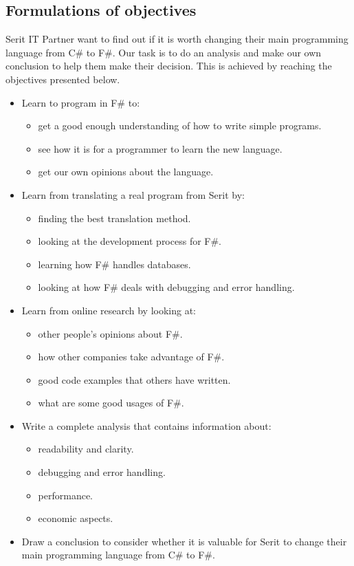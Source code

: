 \documentclass[12pt, a4paper]{article}
\begin{document}
\newpage

\subsection{Formulations of objectives}

Serit IT Partner want to find out if it is worth changing their main programming language from C\# to F\#. Our task is to do an analysis and make our own conclusion to help them make their decision. This is achieved by reaching the objectives presented below.

\begin{itemize}

	\item Learn to program in F\# to:
	\begin{itemize}
		\item get a good enough understanding of how to write simple programs.
		\item see how it is for a programmer to learn the new language.
		\item get our own opinions about the language.
	\end{itemize}
	
	\item Learn from translating a real program from Serit by:
	\begin{itemize}
		\item finding the best translation method.
		\item looking at the development process for F\#.
		\item learning how F\# handles databases.
		\item looking at how F\# deals with debugging and error handling.
		
	\end{itemize}
	\item Learn from online research by looking at:
	\begin{itemize}
		\item other people's opinions about F\#.
		\item how other companies take advantage of F\#.
		\item good code examples that others have written.
		\item what are some good usages of F\#.
	\end{itemize}
	
	\item Write a complete analysis that contains information about:
	\begin{itemize}
		\item readability and clarity.
		\item debugging and error handling.
		\item performance.
		\item economic aspects.
	\end{itemize}
	
	\item Draw a conclusion to consider whether it is valuable for Serit to change their main programming language from C\# to F\#.
	
\end{itemize}
\end{document}
